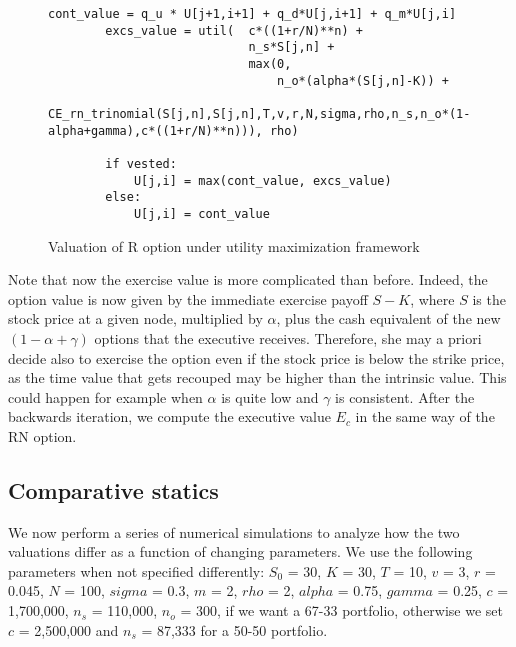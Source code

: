 \begin{figure}[H]
    \begin{lstlisting}[breaklines, basicstyle=\ttfamily\small]
        cont_value = q_u * U[j+1,i+1] + q_d*U[j,i+1] + q_m*U[j,i]
        excs_value = util(  c*((1+r/N)**n) +              
                            n_s*S[j,n] + 
                            max(0, 
                                n_o*(alpha*(S[j,n]-K)) + 
                                CE_rn_trinomial(S[j,n],S[j,n],T,v,r,N,sigma,rho,n_s,n_o*(1-alpha+gamma),c*((1+r/N)**n))), rho)

        if vested:
            U[j,i] = max(cont_value, excs_value)
        else: 
            U[j,i] = cont_value
    \end{lstlisting}
    \caption{Valuation of R option under utility maximization framework}
    \label{fig:ce_r}
\end{figure}



Note that now the exercise value is more complicated than before. Indeed, the option value is now given by the immediate exercise payoff $S-K$, where $S$ is the stock price at a given node, multiplied by $\alpha$, plus the cash equivalent of the new $(1-\alpha+\gamma)$ options that the executive receives. Therefore, she may a priori decide also to exercise the option even if the stock price is below the strike price, as the time value that gets recouped may be higher than the intrinsic value. This could happen for example when $\alpha$ is quite low and $\gamma$ is consistent. 
After the backwards iteration, we compute the executive value $E_c$ in the same way of the RN option.


\subsection{Comparative statics}
We now perform a series of numerical simulations to analyze how the two valuations differ as a function of changing parameters.
We use the following parameters when not specified differently: $S_0$ = 30, $K$ = 30, $T$ = 10, $v$ = 3, $r$ = 0.045, $N$ = 100, $sigma$ = 0.3, $m$ = 2, $rho$ = 2, $alpha$ = 0.75, $gamma$ = 0.25, $c$ = 1,700,000, $n_s$ = 110,000, $n_o$ = 300, if we want a 67-33 portfolio, otherwise we set $c$ = 2,500,000 and $n_s$ = 87,333 for a 50-50 portfolio.

\vspace*{30pt}



